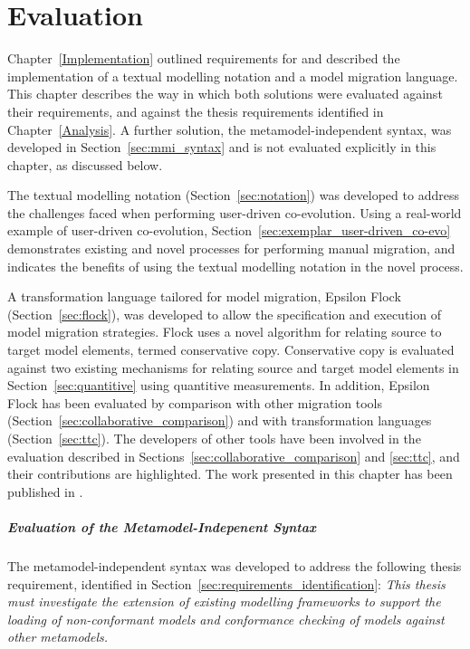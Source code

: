 
\chapter{Evaluation}
\label{Evaluation}
Chapter~\ref{Implementation} outlined requirements for and described the implementation of a textual modelling notation and a model migration language. This chapter describes the way in which both solutions were evaluated against their requirements, and against the thesis requirements identified in Chapter~\ref{Analysis}. A further solution, the metamodel-independent syntax, was developed in Section~\ref{sec:mmi_syntax} and is not evaluated explicitly in this chapter, as discussed below. 

The textual modelling notation (Section~\ref{sec:notation}) was developed to address the challenges faced when performing user-driven co-evolution. Using a real-world example of user-driven co-evolution, Section~\ref{sec:exemplar_user-driven_co-evo} demonstrates existing and novel processes for performing manual migration, and indicates the benefits of using the textual modelling notation in the novel process. 

A transformation language tailored for model migration, Epsilon Flock (Section~\ref{sec:flock}), was developed to allow the specification and execution of model migration strategies. Flock uses a novel algorithm for relating source to target model elements, termed conservative copy. Conservative copy is evaluated against two existing mechanisms for relating source and target model elements in Section~\ref{sec:quantitive} using quantitive measurements. In addition, Epsilon Flock has been evaluated by comparison with other migration tools (Section~\ref{sec:collaborative_comparison}) and with transformation languages (Section~\ref{sec:ttc}). The developers of other tools have been involved in the evaluation described in Sections~\ref{sec:collaborative_comparison} and \ref{sec:ttc}, and their contributions are highlighted. The work presented in this chapter has been published in \cite{rose10comparison,rose10ttc_case,rose10ttc_solution}.

\paragraph{Evaluation of the Metamodel-Indepenent Syntax} The metamodel-independent syntax was developed to address the following thesis requirement, identified in Section~\ref{sec:requirements_identification}: \emph{This thesis must investigate the extension of existing modelling frameworks to support the loading of non-conformant models and conformance checking of models against other metamodels.}

